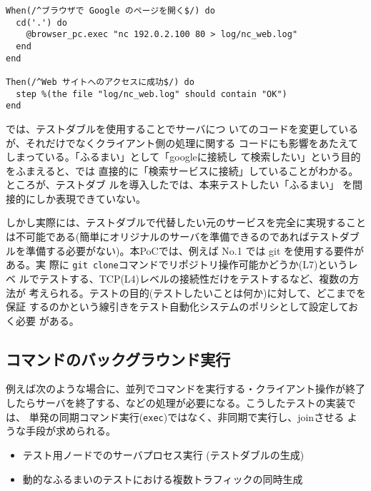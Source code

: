 \begin{lstlisting}[caption=テストダブルを利用する場合,label=lst:testdouble-test]
When(/^ブラウザで Google のページを開く$/) do
  cd('.') do
    @browser_pc.exec "nc 192.0.2.100 80 > log/nc_web.log"
  end
end

Then(/^Web サイトへのアクセスに成功$/) do
  step %(the file "log/nc_web.log" should contain "OK")
end
\end{lstlisting}

では、テストダブルを使用することでサーバにつ
いてのコードを変更しているが、それだけでなくクライアント側の処理に関する
コードにも影響をあたえてしまっている。「ふるまい」として「googleに接続し
て検索したい」という目的をふまえると、では
直接的に「検索サービスに接続」していることがわかる。ところが、テストダブ
ルを導入したでは、本来テストしたい「ふるまい」
を間接的にしか表現できていない。

しかし実際には、テストダブルで代替したい元のサービスを完全に実現すること
は不可能である(簡単にオリジナルのサーバを準備できるのであればテストダブ
ルを準備する必要がない)。本PoCでは、例えば
 No.1 では git を使用する要件がある。実
際に \verb|git clone|コマンドでリポジトリ操作可能かどうか(L7)というレベ
ルでテストする、TCP(L4)レベルの接続性だけをテストするなど、複数の方法が
考えられる。テストの目的(テストしたいことは何か)に対して、どこまでを保証
するのかという線引きをテスト自動化システムのポリシとして設定しておく必要
がある。

  \subsection{コマンドのバックグラウンド実行}
  \label{sec:background-exec-method}

例えば次のような場合に、並列でコマンドを実行する・クライアント操作が終了
したらサーバを終了する、などの処理が必要になる。こうしたテストの実装では、
単発の同期コマンド実行(\verb|exec|)ではなく、非同期で実行し、joinさせる
ような手段が求められる。
\begin{itemize}
 \item テスト用ノードでのサーバプロセス実行 (テストダブルの生成)
 \item 動的なふるまいのテストにおける複数トラフィックの同時生成
\end{itemize}

